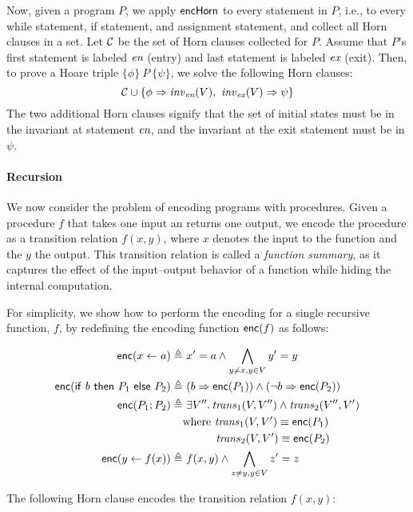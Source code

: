 \documentclass{amsart}
\theoremstyle{definition}
\theoremstyle{remark}
\numberwithin{equation}{section}
\begin{document}
Now, given a program $P$, we apply $\mathsf{encHorn}$ to every statement
in $P$, i.e., to every while statement, if statement, and assignment
statement, and collect all Horn clauses in a set.
Let $\mathcal{C}$ be the set of Horn clauses collected for $P$.
Assume that $P$'s first statement is labeled $\emph{en}$ (entry) and last statement
is labeled $\emph{ex}$ (exit).
Then, to prove a Hoare triple $\{\phi\} \ P  \ \{\psi\}$,
we solve the following Horn clauses:
%
$$ \mathcal{C} \cup \{\phi \Rightarrow \mathit{inv}_{\emph{en}}(V), \  \mathit{inv}_{\emph{ex}}(V) \Rightarrow \psi\}$$
%
The two additional Horn clauses signify that the set of initial states
must be in the invariant at statement $\emph{en}$, and the
invariant at the exit statement must be in $\psi$.

\paragraph{Recursion} We now consider the problem of
encoding programs with procedures.
Given a procedure $f$ that takes one input an returns
one output, we encode the procedure as a transition
relation $f(x,y)$, where $x$ denotes the input to
the function and the $y$ the output. This transition relation
is called a \emph{function summary}, as it captures the effect
of the input--output behavior of a function while hiding the internal
computation.

For simplicity, we show how to perform the encoding for a single
recursive function, $f$, by redefining the encoding function
$\mathsf{enc}(f)$ as follows:

\begin{align*}
  \mathsf{enc}(x \gets a) \triangleq&~  x' = a \land \bigwedge_{y \neq x, y \in V} y' = y\\
  \mathsf{enc}(\mathsf{if}~ b ~ \mathsf{then}~ P_1 ~\mathsf{else}~ P_2) \triangleq&~
    (b \Rightarrow \mathsf{enc}(P_1)) \land (\neg b \Rightarrow \mathsf{enc}(P_2))\\
  \mathsf{enc}(P_1; P_2) \triangleq&~ \exists V'' \ldotp \mathit{trans}_1(V,V'') \land \mathit{trans}_2(V'',V')\\
  & \text{where } \mathit{trans}_1(V,V') \equiv \mathsf{enc}(P_1)\\
        & \hspace{3em} \mathit{trans}_2(V,V') \equiv \mathsf{enc}(P_2)\\
  \mathsf{enc}(y \gets f(x)) \triangleq&~ f(x,y) \land \bigwedge_{z \neq y, y \in V} z' = z\\
\end{align*}

The following Horn clause encodes the transition relation $f(x,y)$:
\end{document}
